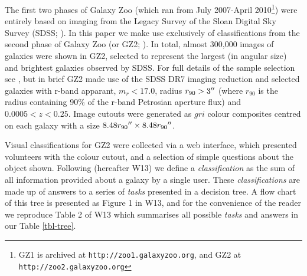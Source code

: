 \documentclass[usenatbib]{mn2e}
\begin{document}
The first two phases of Galaxy Zoo (which ran from July 2007-April 2010\footnote{GZ1 is archived at {\tt http://zoo1.galaxyzoo.org}, and GZ2 at {\tt http://zoo2.galaxyzoo.org}}) were entirely based on imaging from the Legacy Survey of the Sloan Digital Sky Survey (SDSS; \citealt{York2000}). In this paper we make use exclusively of classifications from the second phase of Galaxy Zoo (or GZ2; \citealt{Willett2013}). In total, almost 300,000 images of galaxies were shown in GZ2, selected to represent the largest (in angular size) and brightest galaxies observed by SDSS. For full details of the sample selection see \citet{Willett2013}, but in brief GZ2 made use of the SDSS DR7 imaging reduction \citep{DR7} and selected galaxies with r-band apparant, $m_r<17.0$, radius $r_{90}>3\hbox{$^{\prime\prime}$}$ (where $r_{90}$ is the radius containing 90\% of the r-band Petrosian aperture flux) and $0.0005<z<0.25$. Image cutouts were generated as $gri$ colour composites centred on each galaxy with a size $8.48r_{90}\hbox{$^{\prime\prime}$} \times 8.48r_{90}\hbox{$^{\prime\prime}$}$. 

Visual classifications for GZ2 were collected via a web interface, which presented volunteers with the colour cutout, and a selection of simple questions about the object shown. Following \citet{Willett2013} (hereafter W13) we define a {\it classification} as the sum of all information provided about a galaxy by a single user. These {\it classifications} are made up of answers to a series of {\it tasks} presented in a decision tree. A flow chart of this tree is presented as Figure 1 in W13, and for the convenience of the reader we reproduce Table 2 of W13 which summarises all possible {\it tasks} and answers in our Table \ref{tbl-tree}. 
\end{document}
